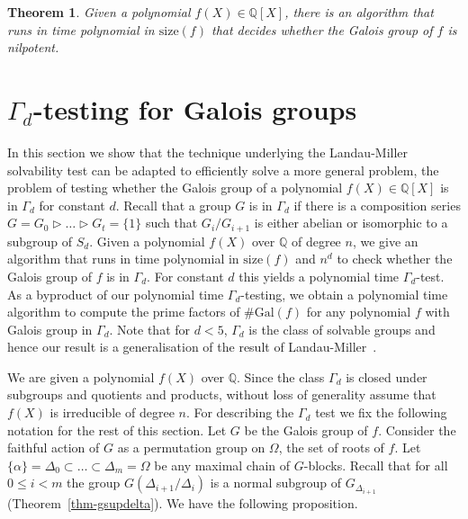 \documentclass[11pt]{madras}%
\newtheorem{theorem}{Theorem}[chapter]
\theoremstyle{remark}
\newcommand{\Gal}[1]{{\ensuremath{\mathrm{Gal}\left(#1\right)}}}
\newcommand{\size}[1]{{\ensuremath{\mathrm{size}\left(#1\right)}}}
\newcommand{\Gof}[2][G]{{\ensuremath{#1\left(#2\right)}}}
\begin{document}
\begin{theorem}
  Given a polynomial $f(X) \in \mathbb{Q}[X]$, there is an algorithm
  that runs in time polynomial in $\size{f}$ that decides whether the
  Galois group of $f$ is nilpotent.
\end{theorem}

\section{$\Gamma_d$-testing for Galois
  groups}\label{sect-gammad-check}

In this section we show that the technique underlying the
Landau-Miller solvability test can be adapted to efficiently solve a
more general problem, the problem of testing whether the Galois group
of a polynomial $f(X) \in \mathbb{Q}[X]$ is in $\Gamma_d$ for constant
$d$.  Recall that a group $G$ is in $\Gamma_d$ if there is a
composition series $G = G_0 \rhd \ldots \rhd G_t = \{ 1 \}$ such that
$G_i/G_{i+1}$ is either abelian or isomorphic to a subgroup of $S_d$.
Given a polynomial $f(X)$ over $\mathbb{Q}$ of degree $n$, we give an
algorithm that runs in time polynomial in $\size{f}$ and $n^d$ to
check whether the Galois group of $f$ is in $\Gamma_d$. For constant
$d$ this yields a polynomial time $\Gamma_d$-test. As a byproduct of
our polynomial time $\Gamma_d$-testing, we obtain a polynomial time
algorithm to compute the prime factors of $\# \Gal{f}$ for any
polynomial $f$ with Galois group in $\Gamma_d$.  Note that for $d <
5$, $\Gamma_d$ is the class of solvable groups and hence our result is
a generalisation of the result of
Landau-Miller~\cite{landau85solvability}.


We are given a polynomial $f(X)$ over $\mathbb{Q}$.  Since the class
$\Gamma_d$ is closed under subgroups and quotients and products,
without loss of generality assume that $f(X)$ is irreducible of degree
$n$. For describing the $\Gamma_d$ test we fix the following notation
for the rest of this section. Let $G$ be the Galois group of $f$.
Consider the faithful action of $G$ as a permutation group on
$\Omega$, the set of roots of $f$.  Let $\{ \alpha \} = \Delta_0
\subset \ldots \subset \Delta_m = \Omega$ be any maximal chain of
$G$-blocks.  Recall that for all $0 \leq i < m$ the group
$\Gof{\Delta_{i+1}/\Delta_i}$ is a normal subgroup of
$G_{\Delta_{i+1}}$ (Theorem~\ref{thm-gsupdelta}).  We have the
following proposition.
\end{document}
